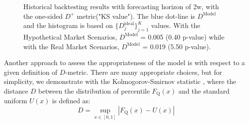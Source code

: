 \documentclass[preprint,12pt]{elsarticle}
\begin{document}
\begin{figure}[!h] 
\hfill
{}
\hfill
{}
\hfill
\caption{Historical backtesting results with forecasting horizon of 2w, with the one-sided $D^+$ metric("KS value"). The blue dot-line is $D^{\textrm{Model}}$ and the histogram is based on $\{D^{\textrm{ideal}}_j\}_{j=1}^K$ values. With the Hypothetical Market Scenarios, $D^{\textrm{Model}}$ = 0.005 (0.40 p-value) while with the Real Market Scenarios, $D^{\textrm{Model}}$ = 0.019 (5.50 p-value).}
\label{fig:backtestingHistogram2w}
\end{figure}

Another approach to assess the appropriateness of the model is with respect to a given definition of $D$-metric. There are many appropriate choices, but for simplicity, we demonstrate with the Kolmogorov-Smirnov statistic \cite{kolmogorov1933}, where the distance $D$ between the distribution of percentile  $F_{\textrm{Q}}(x)$ and the standard uniform $U(x)$ is defined as:
\begin{equation}
D=\sup_{x\in [0,1] }|F_{\textrm{Q}}(x)-U(x)|
\end{equation}
\end{document}
